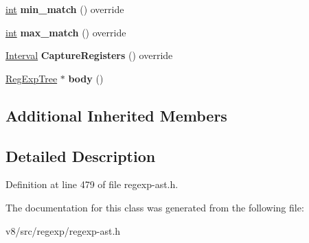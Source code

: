 \begin{DoxyCompactItemize}
\item 
\mbox{\label{classv8_1_1internal_1_1RegExpGroup_a5d0eede464baba7699a68f9983820bf6}} 
\mbox{\hyperlink{classint}{int}} {\bfseries min\+\_\+match} () override
\item 
\mbox{\label{classv8_1_1internal_1_1RegExpGroup_a7a9fba7afb22bb2d47362c7fa64c3566}} 
\mbox{\hyperlink{classint}{int}} {\bfseries max\+\_\+match} () override
\item 
\mbox{\label{classv8_1_1internal_1_1RegExpGroup_a7b6f96623d63454b57e98be454100553}} 
\mbox{\hyperlink{classv8_1_1internal_1_1Interval}{Interval}} {\bfseries Capture\+Registers} () override
\item 
\mbox{\label{classv8_1_1internal_1_1RegExpGroup_a7545e57161d356fb8047b280baa43d45}} 
\mbox{\hyperlink{classv8_1_1internal_1_1RegExpTree}{Reg\+Exp\+Tree}} $\ast$ {\bfseries body} ()
\end{DoxyCompactItemize}
\subsection*{Additional Inherited Members}


\subsection{Detailed Description}


Definition at line 479 of file regexp-\/ast.\+h.



The documentation for this class was generated from the following file\+:\begin{DoxyCompactItemize}
\item 
v8/src/regexp/regexp-\/ast.\+h\end{DoxyCompactItemize}
